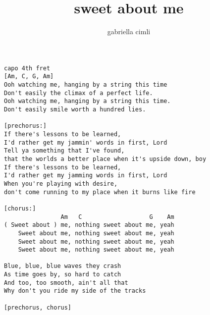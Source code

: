 \author{gabriella cimli}
\title{sweet about me}
\maketitle
\begin{verbatim}
capo 4th fret
[Am, C, G, Am]
Ooh watching me, hanging by a string this time
Don't easily the climax of a perfect life.
Ooh watching me, hanging by a string this time.
Don't easily smile worth a hundred lies.

[prechorus:]
If there's lessons to be learned,
I'd rather get my jammin' words in first, Lord
Tell ya something that I've found, 
that the worlds a better place when it's upside down, boy
If there's lessons to be learned,
I'd rather get my jamming words in first, Lord
When you're playing with desire,
don't come running to my place when it burns like fire

[chorus:]
                Am   C                   G    Am  
( Sweet about ) me, nothing sweet about me, yeah
    Sweet about me, nothing sweet about me, yeah
    Sweet about me, nothing sweet about me, yeah
    Sweet about me, nothing sweet about me, yeah

Blue, blue, blue waves they crash
As time goes by, so hard to catch
And too, too smooth, ain't all that
Why don't you ride my side of the tracks

[prechorus, chorus]
\end{verbatim}